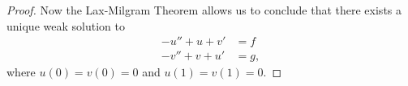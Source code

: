 \documentclass[11pt, oneside]{article}
\begin{document}
\begin{enumerate}
\begin{proof}
      Now the Lax-Milgram Theorem allows us to conclude that there exists a
      unique weak solution to
      \begin{align*}
        -u'' + u + v' &= f \\
        -v'' + v + u' &= g,
      \end{align*}
      where $u(0) = v(0) = 0$ and $u(1) = v(1) = 0$.
    \end{proof}
\end{enumerate}
\end{document}

